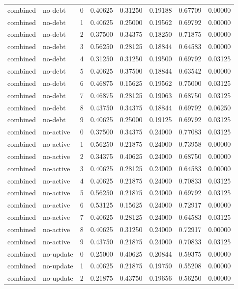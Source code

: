 \documentclass{article}
\begin{document}
\begin{center}
\begin{longtable}{llllllll}
combined & no-debt & 0 & 0.40625 & 0.31250 & 0.19188 & 0.67709 & 0.00000 \\
combined & no-debt & 1 & 0.40625 & 0.25000 & 0.19562 & 0.69792 & 0.00000 \\
combined & no-debt & 2 & 0.37500 & 0.34375 & 0.18250 & 0.71875 & 0.00000 \\
combined & no-debt & 3 & 0.56250 & 0.28125 & 0.18844 & 0.64583 & 0.00000 \\
combined & no-debt & 4 & 0.31250 & 0.31250 & 0.19500 & 0.69792 & 0.03125 \\
combined & no-debt & 5 & 0.40625 & 0.37500 & 0.18844 & 0.63542 & 0.00000 \\
combined & no-debt & 6 & 0.46875 & 0.15625 & 0.19562 & 0.75000 & 0.03125 \\
combined & no-debt & 7 & 0.46875 & 0.28125 & 0.19063 & 0.68750 & 0.03125 \\
combined & no-debt & 8 & 0.43750 & 0.34375 & 0.18844 & 0.69792 & 0.06250 \\
combined & no-debt & 9 & 0.40625 & 0.25000 & 0.19125 & 0.69792 & 0.03125 \\
combined & no-active & 0 & 0.37500 & 0.34375 & 0.24000 & 0.77083 & 0.03125 \\
combined & no-active & 1 & 0.56250 & 0.21875 & 0.24000 & 0.73958 & 0.00000 \\
combined & no-active & 2 & 0.34375 & 0.40625 & 0.24000 & 0.68750 & 0.00000 \\
combined & no-active & 3 & 0.40625 & 0.28125 & 0.24000 & 0.64583 & 0.00000 \\
combined & no-active & 4 & 0.40625 & 0.21875 & 0.24000 & 0.70833 & 0.03125 \\
combined & no-active & 5 & 0.56250 & 0.21875 & 0.24000 & 0.69792 & 0.03125 \\
combined & no-active & 6 & 0.53125 & 0.15625 & 0.24000 & 0.72917 & 0.00000 \\
combined & no-active & 7 & 0.40625 & 0.28125 & 0.24000 & 0.64583 & 0.03125 \\
combined & no-active & 8 & 0.40625 & 0.31250 & 0.24000 & 0.72917 & 0.00000 \\
combined & no-active & 9 & 0.43750 & 0.21875 & 0.24000 & 0.70833 & 0.03125 \\
combined & no-update & 0 & 0.25000 & 0.40625 & 0.20844 & 0.59375 & 0.00000 \\
combined & no-update & 1 & 0.40625 & 0.21875 & 0.19750 & 0.55208 & 0.00000 \\
combined & no-update & 2 & 0.21875 & 0.43750 & 0.19656 & 0.56250 & 0.00000 \\

\end{longtable}
\end{center}
\end{document}
